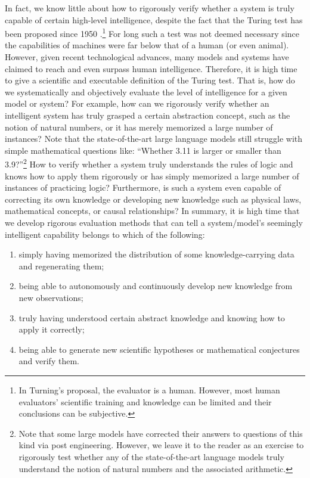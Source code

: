 \documentclass[\toplevelprefix/book-main.tex]{subfiles}
\begin{document}
In fact, we know little about how to rigorously verify whether a system is truly capable of certain high-level intelligence, despite the fact that the Turing test has been proposed since 1950 \cite{Turing-1950}.\footnote{In Turning's proposal, the evaluator is a human. However, most human evaluators' scientific training and knowledge can be limited and their conclusions can be subjective.} For long such a test was not deemed necessary since the capabilities of machines were far below that of a human (or even animal). However, given recent technological advances, many models and systems have claimed to reach and even surpass human intelligence. Therefore, it is high time to give a scientific and executable definition of the Turing test. That is, how do we systematically and objectively evaluate the level of intelligence for a given model or system? For example, how can we rigorously verify whether an intelligent system has truly grasped a certain abstraction concept, such as the notion of natural numbers, or it has merely memorized a large number of instances? Note that the state-of-the-art large language models still struggle with simple mathematical questions like: ``Whether 3.11 is larger or smaller than 3.9?''\footnote{Note that some large models have corrected their answers to questions of this kind via post engineering. However, we leave it to the reader as an exercise to rigorously test whether any of the state-of-the-art language models truly understand the notion of natural numbers and the associated arithmetic.} 
How to verify whether a system truly understands the rules of logic and knows how to apply them rigorously or has simply memorized a large number of instances of practicing logic? Furthermore, is such a system even capable of correcting its own knowledge or developing new knowledge such as physical laws, mathematical concepts, or causal relationships? In summary, it is high time that we develop rigorous evaluation methods that can tell a system/model's seemingly intelligent capability belongs to which of the following: 
\begin{enumerate}
    \item simply having memorized the distribution of some knowledge-carrying data and regenerating them;
    \item being able to autonomously and continuously develop new knowledge from new observations;
    \item truly having understood certain abstract knowledge and knowing how to apply it correctly;
    \item being able to generate new scientific hypotheses or mathematical conjectures and verify them.
\end{enumerate}
\end{document}
